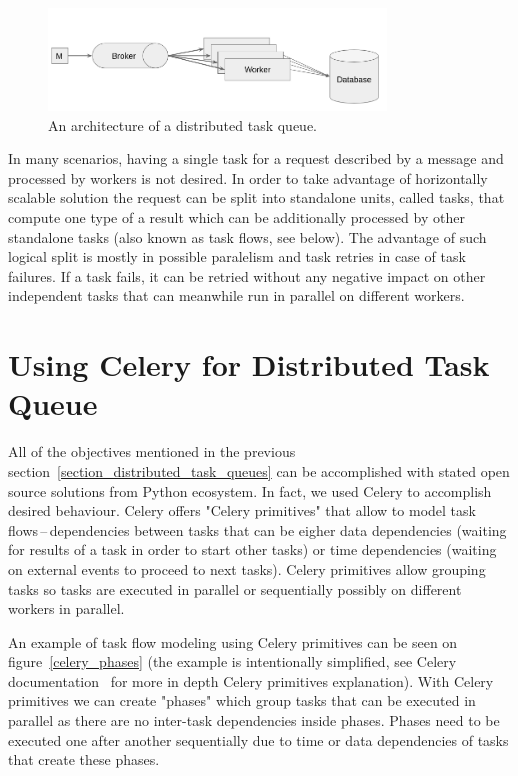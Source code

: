 \documentclass[a4paper]{llncs}
\begin{document}
\begin{figure}
  \centering
  \includegraphics[width=0.8\textwidth]{fig/architecture.png}
  \caption{An architecture of a distributed task queue.}
  \label{architecture}
\end{figure}

In many scenarios, having a single task for a request described by a message and processed by workers is not desired. In order to take advantage of horizontally scalable solution the request can be split into standalone units, called tasks, that compute one type of a result which can be additionally processed by other standalone tasks (also known as task flows, see below). The advantage of such logical split is mostly in possible paralelism and task retries in case of task failures. If a task fails, it can be retried without any negative impact on other independent tasks that can meanwhile run in parallel on different workers.

\section{Using Celery for Distributed Task Queue}

All of the objectives mentioned in the previous section~\ref{section_distributed_task_queues} can be accomplished with stated open source solutions from Python ecosystem. In fact, we used Celery to accomplish desired behaviour. Celery offers "Celery primitives" that allow to model task flows\,--\,dependencies between tasks that can be eigher data dependencies (waiting for results of a task in order to start other tasks) or time dependencies (waiting on external events to proceed to next tasks). Celery primitives allow grouping tasks so tasks are executed in parallel or sequentially possibly on different workers in parallel.

An example of task flow modeling using Celery primitives can be seen on figure~\ref{celery_phases} (the example is intentionally simplified, see Celery documentation~\cite{ref_celery_docs} for more in depth Celery primitives explanation). With Celery primitives we can create "phases" which group tasks that can be executed in parallel as there are no inter-task dependencies inside phases. Phases need to be executed one after another sequentially due to time or data dependencies of tasks that create these phases.
\end{document}
